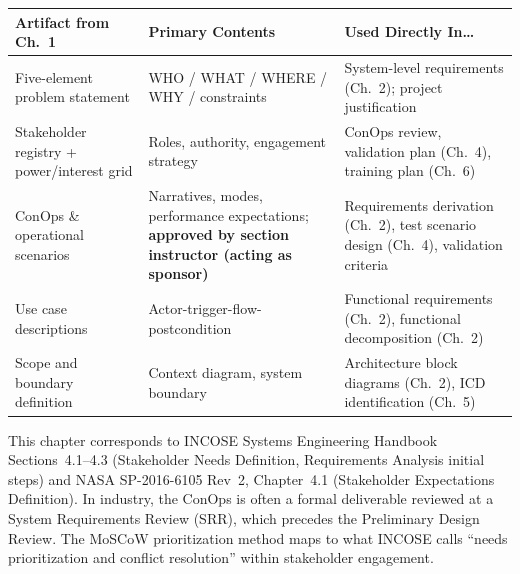 \documentclass[11pt,letterpaper,twoside,openany]{book}
\begin{document}
\begin{center}
\small
\begin{tabularx}{\textwidth}{l X X}
\toprule
\textbf{Artifact from Ch.~1} & \textbf{Primary Contents} & \textbf{Used Directly In\ldots} \\
\midrule
Five-element problem statement & WHO / WHAT / WHERE / WHY / constraints & System-level requirements (Ch.~2); project justification \\
Stakeholder registry + power/interest grid & Roles, authority, engagement strategy & ConOps review, validation plan (Ch.~4), training plan (Ch.~6) \\
ConOps \& operational scenarios & Narratives, modes, performance expectations; \textbf{approved by section instructor (acting as sponsor)} & Requirements derivation (Ch.~2), test scenario design (Ch.~4), validation criteria \\
Use case descriptions & Actor-trigger-flow-postcondition & Functional requirements (Ch.~2), functional decomposition (Ch.~2) \\
Scope and boundary definition & Context diagram, system boundary & Architecture block diagrams (Ch.~2), ICD identification (Ch.~5) \\
\bottomrule
\end{tabularx}
\end{center}

\begin{tipbox}
This chapter corresponds to INCOSE Systems Engineering Handbook Sections~4.1--4.3 (Stakeholder Needs Definition, Requirements Analysis initial steps) and NASA SP-2016-6105 Rev~2, Chapter~4.1 (Stakeholder Expectations Definition). In industry, the ConOps is often a formal deliverable reviewed at a System Requirements Review (SRR), which precedes the Preliminary Design Review. The MoSCoW prioritization method maps to what INCOSE calls ``needs prioritization and conflict resolution'' within stakeholder engagement.
\end{tipbox}

\FloatBarrier
\end{document}
